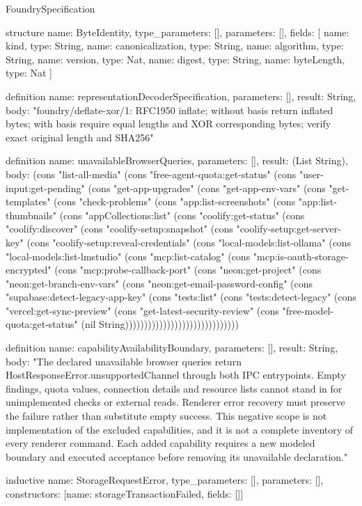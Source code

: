\begin{lexlean}{FoundrySpecification}
\begin{semanticmodule}
structure{
  name: ByteIdentity,
  type_parameters: [],
  parameters: [],
  fields: [
    {name: kind, type: String},
    {name: canonicalization, type: String},
    {name: algorithm, type: String},
    {name: version, type: Nat},
    {name: digest, type: String},
    {name: byteLength, type: Nat}
  ]
}

definition{
  name: representationDecoderSpecification,
  parameters: [],
  result: String,
  body: "foundry/deflate-xor/1: RFC1950 inflate; without basis return inflated bytes; with basis require equal lengths and XOR corresponding bytes; verify exact original length and SHA256"
}

definition{
  name: unavailableBrowserQueries,
  parameters: [],
  result: (List String),
  body: (cons "list-all-media" (cons "free-agent-quota:get-status" (cons "user-input:get-pending" (cons "get-app-upgrades" (cons "get-app-env-vars" (cons "get-templates" (cons "check-problems" (cons "app:list-screenshots" (cons "app:list-thumbnails" (cons "appCollections:list" (cons "coolify:get-status" (cons "coolify:discover" (cons "coolify-setup:snapshot" (cons "coolify-setup:get-server-key" (cons "coolify-setup:reveal-credentials" (cons "local-models:list-ollama" (cons "local-models:list-lmstudio" (cons "mcp:list-catalog" (cons "mcp:is-oauth-storage-encrypted" (cons "mcp:probe-callback-port" (cons "neon:get-project" (cons "neon:get-branch-env-vars" (cons "neon:get-email-password-config" (cons "supabase:detect-legacy-app-key" (cons "tests:list" (cons "tests:detect-legacy" (cons "vercel:get-sync-preview" (cons "get-latest-security-review" (cons "free-model-quota:get-status" (nil String))))))))))))))))))))))))))))))
}

definition{
  name: capabilityAvailabilityBoundary,
  parameters: [],
  result: String,
  body: "The declared unavailable browser queries return HostResponseError.unsupportedChannel through both IPC entrypoints. Empty findings, quota values, connection details and resource lists cannot stand in for unimplemented checks or external reads. Renderer error recovery must preserve the failure rather than substitute empty success. This negative scope is not implementation of the excluded capabilities, and it is not a complete inventory of every renderer command. Each added capability requires a new modeled boundary and executed acceptance before removing its unavailable declaration."
}

inductive{
  name: StorageRequestError,
  type_parameters: [],
  parameters: [],
  constructors: [{name: storageTransactionFailed, fields: []}]
}


\end{semanticmodule}
\end{lexlean}
